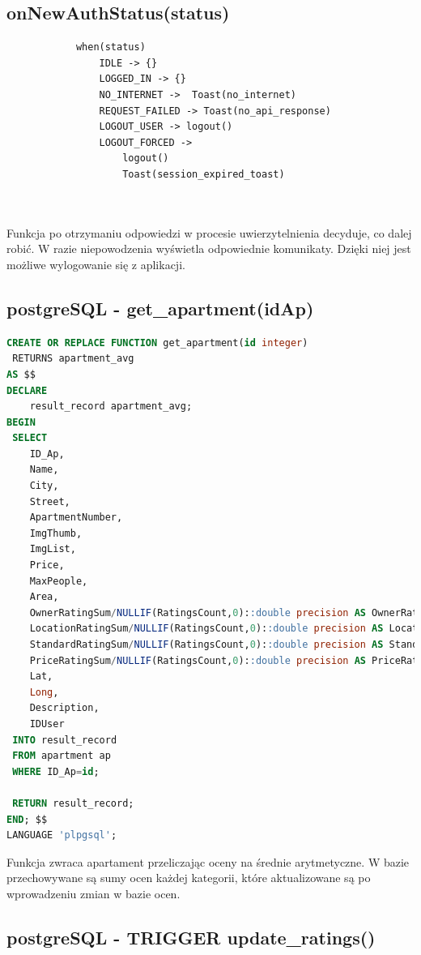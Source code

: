\documentclass[polish, 11pt]{article}
\begin{document}
    \subsection{onNewAuthStatus(status)}
        \begin{lstlisting}
            when(status)
                IDLE -> {}
                LOGGED_IN -> {}
                NO_INTERNET ->  Toast(no_internet)
                REQUEST_FAILED -> Toast(no_api_response)
                LOGOUT_USER -> logout()
                LOGOUT_FORCED -> 
                    logout()
                    Toast(session_expired_toast)
              
            
        \end{lstlisting}
        Funkcja po otrzymaniu odpowiedzi w procesie uwierzytelnienia decyduje, co dalej robić. W razie niepowodzenia wyświetla odpowiednie komunikaty. Dzięki niej jest możliwe wylogowanie się z aplikacji.


    \subsection{postgreSQL - get\_apartment(idAp)}
    
    \begin{lstlisting}[language=SQL]
CREATE OR REPLACE FUNCTION get_apartment(id integer) 
 RETURNS apartment_avg
AS $$
DECLARE
	result_record apartment_avg;
BEGIN
 SELECT 
	ID_Ap,
	Name,
	City,
	Street,
	ApartmentNumber,
	ImgThumb,
	ImgList,
	Price,
	MaxPeople,
	Area,
	OwnerRatingSum/NULLIF(RatingsCount,0)::double precision AS OwnerRating,
	LocationRatingSum/NULLIF(RatingsCount,0)::double precision AS LocationRating,
	StandardRatingSum/NULLIF(RatingsCount,0)::double precision AS StandardRating,
	PriceRatingSum/NULLIF(RatingsCount,0)::double precision AS PriceRating,
	Lat,
	Long,
	Description,
	IDUser
 INTO result_record
 FROM apartment ap
 WHERE ID_Ap=id;
 
 RETURN result_record;
END; $$ 
LANGUAGE 'plpgsql';
    \end{lstlisting}
    Funkcja zwraca apartament przeliczając oceny na średnie arytmetyczne.
    W bazie przechowywane są sumy ocen każdej kategorii, które aktualizowane są po wprowadzeniu zmian w bazie ocen.
    
    \subsection{postgreSQL - TRIGGER update\_ratings()}
    
\end{document}
